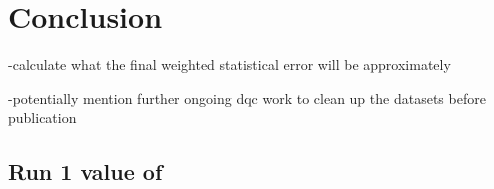 
\thispagestyle{myheadings} %

\chapter{Conclusion}
\label{chapter:Conclusion}



-calculate what the final weighted statistical error will be approximately

-potentially mention further ongoing dqc work to clean up the datasets before publication



\section{Run 1 value of \amu}
\label{sec:FinalValue}



\cleardoublepage
